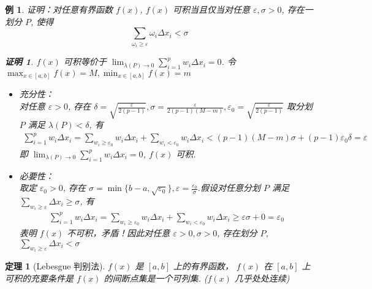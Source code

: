 \documentclass{ctexart}
\newcommand{\。}{．} %
\newenvironment{huangse}{
    \begin{tcolorbox}[enhanced, breakable, colback=qhuang, boxrule=0pt, frame hidden,
        borderline west={0.7mm}{0.1mm}{shuang}]
    }
    {\end{tcolorbox}}
\newenvironment{zise}{
    \begin{tcolorbox}[enhanced, breakable, colback=qzi, boxrule=0pt, frame hidden,
        borderline west={0.7mm}{0.1mm}{szi}]
    }
    {\end{tcolorbox}}
\theoremstyle{t} %
\newtheorem{dlhj}{\color{shuang} 定理}[subsection]
\newtheorem{lthj}{\color{szi} 例}[subsection]
\newtheorem*{zmhj}{\color{slan} 证明}
\newenvironment{dl}{\begin{huangse}\begin{dlhj}}{\end{dlhj}\end{huangse}}
\newenvironment{lt}{\begin{zise}\begin{lthj}}{\end{lthj}\end{zise}}
\begin{document}
\begin{lt}\label{可积当且仅当对任意}
    证明：对任意有界函数 $f(x)$, $f(x)$ 可积当且仅当对任意 $\varepsilon, \sigma > 0$, 存在一划分 $P$, 使得
    \[
        \sum_{\omega_i \geqslant \varepsilon}\omega_i \Delta x_i < \sigma 
    \]
    \begin{zmhj}
        $f(x)$ 可积等价于 $\lim_{\lambda(P) \to 0}\sum_{i = 1}^{p}w_i\Delta x_i = 0$. 令 $\max_{x \in [a, b]} f(x) = M, \min_{x \in [a, b]} f(x) = m$ \\
        \begin{itemize}
            \item 充分性： \\
            对任意 $\varepsilon > 0$, 存在 $\delta = \sqrt{\frac{\varepsilon}{2(p - 1)}}, \sigma = \frac{\varepsilon}{2(p - 1)(M - m)}, \varepsilon_0 = \sqrt{\frac{\varepsilon}{2(p - 1)}}$ 取分划 $P$ 满足 $\lambda(P) < \delta$, 有
            \begin{align*}
                \sum_{i = 1}^{p}w_i\Delta x_i = \sum_{w_i \geqslant \varepsilon_0}w_i\Delta x_i + \sum_{w_i < \varepsilon_0}w_i\Delta x_i < (p - 1)(M - m)\sigma + (p - 1)\varepsilon_0\delta = \varepsilon
            \end{align*}
            即 $\lim_{\lambda(P) \to 0}\sum_{i = 1}^{p}w_i\Delta x_i = 0$, $f(x)$ 可积.
            \item 必要性：\\
            取定 $\varepsilon_0 > 0$, 存在 $\sigma = \min \{b - a, \sqrt{\varepsilon_0}\}, \varepsilon = \frac{\varepsilon_0}{\sigma}$.假设对任意分划 $P$ 满足 $\sum_{w_i \geqslant \varepsilon}\Delta x_i \geqslant \sigma$, 有
            \begin{align*}
                \sum_{i = 1}^{p}w_i\Delta x_i = \sum_{w_i \geqslant \varepsilon_0}w_i\Delta x_i + \sum_{w_i < \varepsilon_0}w_i\Delta x_i \geqslant \varepsilon \sigma + 0 = \varepsilon_0
            \end{align*}
            表明 $f(x)$ 不可积，矛盾！因此对任意 $\varepsilon > 0, \sigma > 0$, 存在划分 $P$, $\sum_{w_i \geqslant \varepsilon}\Delta x_i < \sigma$
        \end{itemize}
    \end{zmhj}
\end{lt}

\begin{dl}[Lebesgue 判别法]
    $f(x)$ 是 $[a, b]$ 上的有界函数， $f(x)$ 在 $[a, b]$ 上可积的充要条件是 $f(x)$ 的间断点集是一个可列集. ($f(x)$ 几乎处处连续)
\end{dl}
\end{document}
